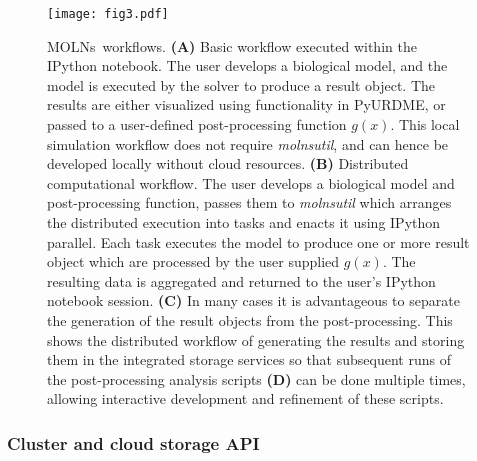 \documentclass[final,leqno,onefignum,onetabnum]{siamltex1213}
\def\packagename {MOLNs}
\begin{document}
\begin{figure}[htpb]
\begin{center}
\texttt{[image: fig3.pdf]}
\end{center}
\caption{\packagename~workflows.
{\bf (A)} Basic workflow executed within the IPython notebook.  The user develops a biological model, and the model is executed by the solver to produce a result object. The results are either visualized using functionality in PyURDME, or passed to a user-defined post-processing function $g(x)$. This local simulation workflow does not require \emph{molnsutil}, and can hence be developed locally without cloud resources. 
{\bf (B)} Distributed computational workflow. The user develops a biological model and post-processing function, passes them to \emph{molnsutil} which arranges the distributed execution into tasks and enacts it using IPython parallel. Each task executes the model to produce one or more result object which are processed by the user supplied $g(x)$.  The resulting data is aggregated and returned to the user's IPython notebook session.
{\bf (C)} In many cases it is advantageous to separate the generation of the result objects from the post-processing.  This shows the distributed workflow of generating the results and storing them in the integrated storage services so that subsequent runs of the post-processing analysis scripts {\bf (D)} can be done multiple times, allowing interactive development and refinement of these scripts.
}
\label{fig:workflows}
\end{figure}

\subsubsection{Cluster and cloud storage API}
\end{document}

